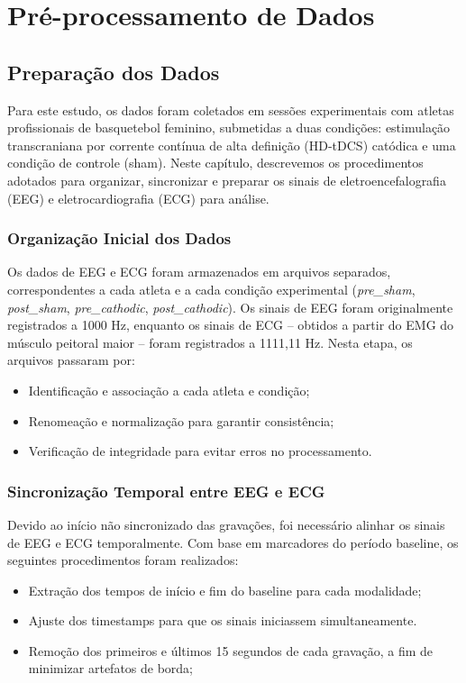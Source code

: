 \chapter{Pré-processamento de Dados}
\label{chap:preprocessamento_de_dados}

\section{Preparação dos Dados}
Para este estudo, os dados foram coletados em sessões experimentais com atletas profissionais de basquetebol feminino, submetidas a duas condições: estimulação transcraniana por corrente contínua de alta definição (HD-tDCS) catódica e uma condição de controle (sham). Neste capítulo, descrevemos os procedimentos adotados para organizar, sincronizar e preparar os sinais de eletroencefalografia (EEG) e eletrocardiografia (ECG) para análise.

\subsection{Organização Inicial dos Dados}
Os dados de EEG e ECG foram armazenados em arquivos separados, correspondentes a cada atleta e a cada condição experimental (\textit{pre\_sham}, \textit{post\_sham}, \textit{pre\_cathodic}, \textit{post\_cathodic}). Os sinais de EEG foram originalmente registrados a 1000 Hz, enquanto os sinais de ECG – obtidos a partir do EMG do músculo peitoral maior – foram registrados a 1111,11 Hz. Nesta etapa, os arquivos passaram por:
\begin{itemize}
    \item Identificação e associação a cada atleta e condição;
    \item Renomeação e normalização para garantir consistência;
    \item Verificação de integridade para evitar erros no processamento.
\end{itemize}

\subsection{Sincronização Temporal entre EEG e ECG}
Devido ao início não sincronizado das gravações, foi necessário alinhar os sinais de EEG e ECG temporalmente. Com base em marcadores do período baseline, os seguintes procedimentos foram realizados:
\begin{itemize}
    \item Extração dos tempos de início e fim do baseline para cada modalidade;
    \item Ajuste dos timestamps para que os sinais iniciassem simultaneamente.
    \item Remoção dos primeiros e últimos 15 segundos de cada gravação, a fim de minimizar artefatos de borda;
\end{itemize}

